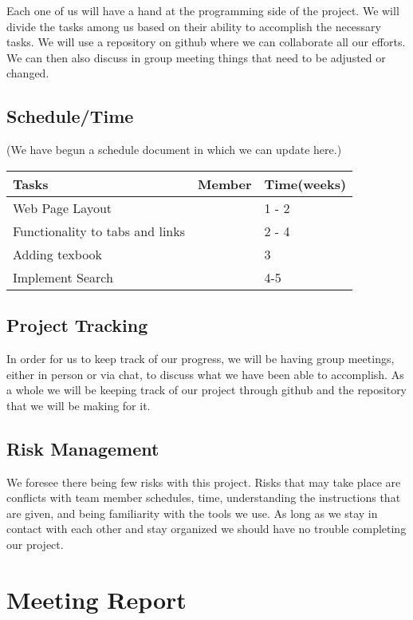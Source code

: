 \documentclass[12pt]{article}
\begin{document}
	\quad Each one of us will have a hand at the programming side of the project. We will divide the tasks among us based on their ability to accomplish the necessary tasks. We will use a repository on github where we can collaborate all our efforts. We can then also discuss in group meeting things that need to be adjusted or changed. 

		\subsection{Schedule/Time}
    (We have begun a schedule document in which we can update here.)
		
		\begin{tabular}{ | l | l | l | }
		\hline
		Tasks & Member & Time(weeks) \\ \hline
		Web Page Layout & & 1 - 2	\\ \hline
		Functionality to tabs and links & & 2 - 4 \\ \hline
		Adding texbook & & 3 \\ \hline
		Implement Search & & 4-5 \\	

		\hline
		\end{tabular}

		

		\subsection{Project Tracking}

\quad In order for us to keep track of our progress, we will be having group meetings, either in person or via chat, to discuss what we have been able to accomplish. As a whole we will be keeping track of our project through github and the repository that we will be making for it.

		\subsection{Risk Management}
\quad We foresee there being few risks with this project. Risks that may take place are conflicts with team member schedules, time, understanding the instructions that are given, and being familiarity with the tools we use. As long as we stay in contact with each other and stay organized we should have no trouble completing our project. 



	\section{Meeting Report}
\end{document}
